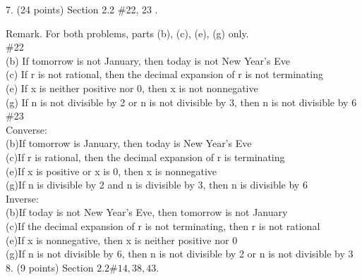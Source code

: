\documentclass{article}
\begin{document}
7. (24 points) Section 2.2 \#22, 23 .

Remark. For both problems, parts (b), (c), (e), (g) only.\\
\#22\\ 
(b) If tomorrow is not January, then today is not New Year's Eve\\
(c) If r is not rational, then the decimal expansion of r is not terminating\\
(e) If x is neither positive nor 0, then x is not nonnegative\\
(g) If n is not divisible by 2 or n is not divisible by 3, then n is not divisible by 6\\
\#23\\
Converse:\\
(b)If tomorrow is January, then today is New Year's Eve\\
(c)If r is rational, then the decimal expansion of r is terminating\\
(e)If x is positive or x is 0, then x is nonnegative\\
(g)If n is divisible by 2 and n is divisible by 3, then n is divisible by 6\\
Inverse:\\
(b)If today is not New Year's Eve, then tomorrow is not January\\
(c)If the decimal expansion of r is not terminating, then r is not rational\\
(e)If x is nonnegative, then x is neither positive nor 0\\
(g)If n is not divisible by 6, then n is not divisible by 2 or n is not divisible by 3\\
8. (9 points) Section $2.2 \# 14,38,43$.
\end{document}
